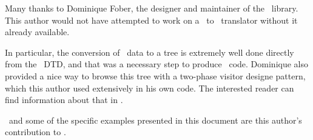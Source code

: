Many thanks to Dominique Fober, the designer and maintainer of the \lib\ library. This author would not have attempted to work on a \mxml\ to \lily\ translator without it already available.

In particular, the conversion of \mxml\ data to a tree is extremely well done directly from the \mxml\ DTD, and that was a necessary step to produce \lily\ code. Dominique also provided a nice way to browse this tree with a two-phase visitor designe pattern, which this author used extensively in his own code. The interested reader can find information about that in .

\xmlToLy\ and some of the specific examples presented in this document are this author's contribution to \lib.

